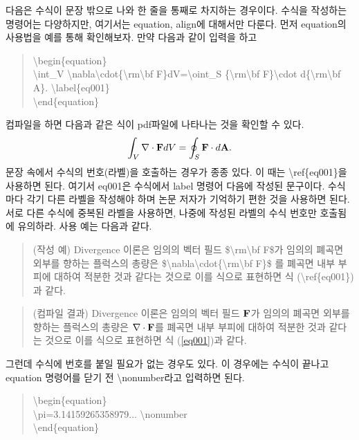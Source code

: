 \documentclass[twoside,11pt]{gshs_thesis}
\begin{document}
다음은 수식이 문장 밖으로 나와 한 줄을 통째로 차지하는 경우이다. 수식을 작성하는 명령어는 다양하지만, 여기서는 equation, align에 대해서만 다룬다. 먼저 equation의 사용법을 예를 통해 확인해보자. 만약 다음과 같이 입력을 하고
\begin{quote}
{\textbackslash}begin\{equation\}\\
{\textbackslash}int\_V {\textbackslash}nabla{\textbackslash}cdot\{{\textbackslash}rm{\textbackslash}bf F\}dV={\textbackslash}oint\_S \{{\textbackslash}rm{\textbackslash}bf F\}{\textbackslash}cdot d\{{\textbackslash}rm{\textbackslash}bf A\}. {\textbackslash}label\{eq001\} \\
{\textbackslash}end\{equation\}
\end{quote}
컴파일을 하면 다음과 같은 식이 pdf파일에 나타나는 것을 확인할 수 있다.
\begin{equation}
\int_V \nabla\cdot{\rm\bf F} dV = \oint_S {\rm\bf F}\cdot d{\rm\bf A}. \label{eq001}
\end{equation}
문장 속에서 수식의 번호(라벨)을 호출하는 경우가 종종 있다. 이 때는 {\textbackslash}ref\{eq001\}을 사용하면 된다. 여기서 eq001은 수식에서 label 명령어 다음에 작성된 문구이다. 수식마다 각기 다른 라벨을 작성해야 하며 논문 저자가 기억하기 편한 것을 사용하면 된다. 서로 다른 수식에 중복된 라벨을 사용하면, 나중에 작성된 라벨의 수식 번호만 호출됨에 유의하라. 사용 예는 다음과 같다.
\begin{quote}
(작성 예) Divergence 이론은 임의의 벡터 필드 \${\textbackslash}rm{\textbackslash}bf F\$가 임의의 폐곡면 외부를 향하는 플럭스의 총량은 \${\textbackslash}nabla{\textbackslash}cdot\{{\textbackslash}rm{\textbackslash}bf F\}\$ 를 폐곡면 내부 부피에 대하여 적분한 것과 같다는 것으로 이를 식으로 표현하면 식 ({\textbackslash}ref\{eq001\}) 과 같다.
\end{quote}
\begin{quote}
(컴파일 결과) Divergence 이론은 임의의 벡터 필드 $\rm\bf F$가 임의의 폐곡면 외부를 향하는 플럭스의 총량은 $\nabla\cdot{\rm\bf F}$를 폐곡면 내부 부피에 대하여 적분한 것과 같다는 것으로 이를 식으로 표현하면 식 (\ref{eq001})과 같다.
\end{quote}
그런데 수식에 번호를 붙일 필요가 없는 경우도 있다. 이 경우에는 수식이 끝나고 equation 명령어를 닫기 전 {\textbackslash}nonumber라고 입력하면 된다.
\begin{quote}
{\textbackslash}begin\{equation\}\\
{\textbackslash}pi=3.14159265358979... {\textbackslash}nonumber \\
{\textbackslash}end\{equation\}
\end{quote}
\end{document}
